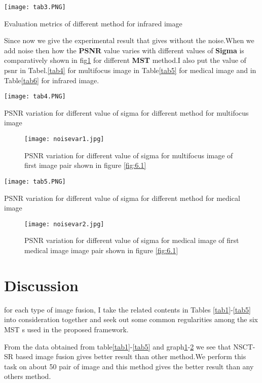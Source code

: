 \begin{table}[!htb] 
 \centering
  \texttt{[image: tab3.PNG]}
  \caption{Evaluation metrics of different method for infrared image}
  \label{tab3}
\end{table}

Since now we give the experimental result that gives without the noise.When we add noise then how the \textbf{PSNR}  value varies with different values of \textbf{Sigma} is comparatively shown in fig\ref{graph1} for different \textbf{MST} method.I also put the value of psnr in Tabel.\ref{tab4} for multifocus image in Table\ref{tab5} for medical image and in Table\ref{tab6} for infrared image.  

\begin{table}[!htb] 
 \centering
  \texttt{[image: tab4.PNG]}
  \caption{PSNR variation for different value of sigma for different method for multifocus image}
  \label{tab4}
\end{table}

\begin{figure}[h!]
  \centering
  \texttt{[image: noisevar1.jpg]}
  \caption{PSNR variation for different value of sigma for multifocus image of first image pair shown in figure \ref{fig:6.1}}\label{graph1}
\end{figure}

\begin{table}[!htb] 
 \centering
  \texttt{[image: tab5.PNG]}
  \caption{PSNR variation for different value of sigma for different method for medical image}
  \label{tab5}
\end{table}

\begin{figure}[h!]
  \centering
  \texttt{[image: noisevar2.jpg]}
  \caption{PSNR variation for different value of sigma for medical image of first medical image image pair shown in figure \ref{fig:6.1}}
  \label{graph2}
\end{figure}

\section{Discussion}
 for each type of image fusion, I take the related contents in Tables \ref{tab1}-\ref{tab5} into consideration together and seek out some common regularities among the six MST s used in the proposed framework. \hfill \break
 
 From the data obtained from table\ref{tab1}-\ref{tab5} and graph\ref{graph1}-\ref{graph2} we see that NSCT-SR based image fusion gives better result than other method.We perform this task on about 50 pair of image and this method gives the better result than any others method. 


